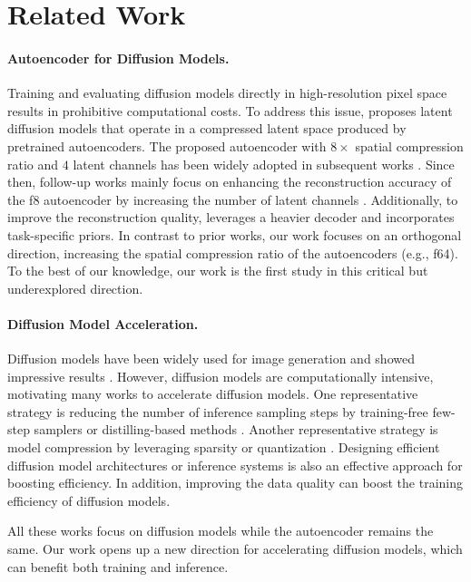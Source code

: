 \section{Related Work}
\label{sec:related}

\paragraph{Autoencoder for Diffusion Models.}
Training and evaluating diffusion models directly in high-resolution pixel space results in prohibitive computational costs. To address this issue, \cite{rombach2022high} proposes latent diffusion models that operate in a compressed latent space produced by pretrained autoencoders. The proposed autoencoder with $8\times$ spatial compression ratio and $4$ latent channels has been widely adopted in subsequent works \citep{peebles2023scalable,bao2023all}. Since then, follow-up works mainly focus on enhancing the reconstruction accuracy of the f8 autoencoder by increasing the number of latent channels \citep{esser2024scaling,dai2023emu,flux2024}. Additionally, to improve the reconstruction quality, \cite{zhu2023designing} leverages a heavier decoder and incorporates task-specific priors. In contrast to prior works, our work focuses on an orthogonal direction, increasing the spatial compression ratio of the autoencoders (e.g., f64). To the best of our knowledge, our work is the first study in this critical but underexplored direction. 

\vspace{-5pt}
\paragraph{Diffusion Model Acceleration.}
Diffusion models have been widely used for image generation and showed impressive results \citep{flux2024,esser2024scaling}. However, diffusion models are computationally intensive, motivating many works to accelerate diffusion models. One representative strategy is reducing the number of inference sampling steps by training-free few-step samplers \citep{songdenoising, lu2022dpm, lu2022dpm2, zheng2023dpm, zhangfast, zhanggddim, zhao2024unipc, shih2024parallel, tang2024accelerating} or distilling-based methods \citep{meng2023distillation, salimans2022progressive, yin2024one, yin2024improved, song2023consistency, luo2023latent, liu2023instaflow}. Another representative strategy is model compression by leveraging sparsity \citep{li2022efficient, ma2024deepcache} or quantization \citep{he2024ptqd, fang2024structural, li2023q, zhao2024vidit}. Designing efficient diffusion model architectures \citep{li2024snapfusion,liu2024linfusion,cai2024condition} or inference systems \citep{li2024distrifusion, wang2024pipefusion} is also an effective approach for boosting efficiency. In addition, improving the data quality \citep{chenpixart,chen2024pixart} can boost the training efficiency of diffusion models. 

All these works focus on diffusion models while the autoencoder remains the same. Our work opens up a new direction for accelerating diffusion models, which can benefit both training and inference.